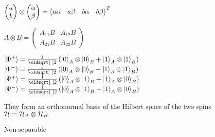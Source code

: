 \columnbreak
{}
$\begin{pmatrix} a \\ b \end{pmatrix} \otimes \begin{pmatrix} \alpha \\ \beta \end{pmatrix} = \begin{pmatrix} a \alpha & a \beta & b \alpha & b \beta \end{pmatrix}^T$

$A \otimes B = \begin{pmatrix} A_{11}B & A_{12}B \\ A_{21}B & A_{22}B \end{pmatrix}$

\begin{squishlist}
    \item $\ket{\Phi^+} = \frac{1}{\sqrt{2}} \left( \ket{0}_A \otimes \ket{0}_B + \ket{1}_A \otimes \ket{1}_B\right)$ \\
          $\ket{\Phi^-} = \frac{1}{\sqrt{2}} \left( \ket{0}_A \otimes \ket{0}_B - \ket{1}_A \otimes \ket{1}_B\right)$ \\
          $\ket{\Psi^+} = \frac{1}{\sqrt{2}} \left( \ket{0}_A \otimes \ket{1}_B + \ket{1}_A \otimes \ket{0}_B\right)$ \\
          $\ket{\Psi^-} = \frac{1}{\sqrt{2}} \left( \ket{0}_A \otimes \ket{1}_B - \ket{1}_A \otimes \ket{0}_B\right)$
    \item They form an orthonormal basis of the Hilbert space of the two spins $\mathcal{H} = \mathcal{H}_A \otimes \mathcal{H}_B$
    \item Non separable
\end{squishlist}
\columnbreak